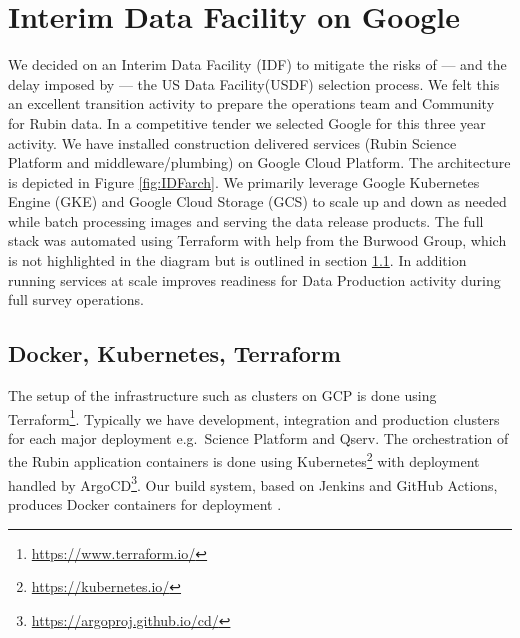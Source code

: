 \documentclass[11pt,twoside]{article}
\begin{document}
\section{Interim Data Facility on Google }
We decided on an Interim Data Facility (IDF) to mitigate the risks of — and the delay imposed by — the US Data Facility(USDF)  selection process.
We felt this an excellent transition activity to prepare the operations  team and Community for Rubin data.
In a competitive tender we selected Google for this three year activity.
We have installed construction delivered services (Rubin Science Platform and middleware/plumbing) on Google Cloud Platform.
The architecture is depicted in Figure \ref{fig:IDFarch}.
We primarily leverage Google Kubernetes Engine (GKE) and Google Cloud Storage (GCS) to scale up and down as needed while batch processing images  and serving the data release products.
The full stack was automated using Terraform with help from the Burwood Group, which is not highlighted in the diagram but is outlined in section \ref{sec:infra}.
In addition running services at scale improves readiness for Data Production activity during full survey operations.







\subsection{ Docker, Kubernetes, Terraform} \label{sec:infra}
The setup of the infrastructure such as clusters on GCP is done using Terraform\footnote{\url{https://www.terraform.io/}}.
Typically we have development, integration and production clusters for each major deployment e.g.\ Science Platform and Qserv.
The orchestration of the Rubin application containers is done using Kubernetes\footnote{\url{https://kubernetes.io/}} with deployment handled by ArgoCD\footnote{\url{https://argoproj.github.io/cd/}}.
Our build system, based on Jenkins and GitHub Actions,  produces Docker containers for deployment \citep[see e.g.,][]{2018SPIE10707E..09J}.
\end{document}
